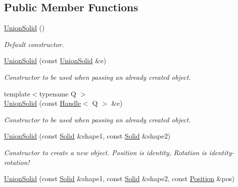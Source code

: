 \subsection*{Public Member Functions}
\begin{DoxyCompactItemize}
\item 
\hyperlink{class_d_d4hep_1_1_geometry_1_1_union_solid_abf1979091a6225ca36608b19d00e48b0}{UnionSolid} ()
\begin{DoxyCompactList}\small\item\em Default constructor. \item\end{DoxyCompactList}\item 
\hyperlink{class_d_d4hep_1_1_geometry_1_1_union_solid_a53a4143df5a2039f5ec1e5289f03fe6a}{UnionSolid} (const \hyperlink{class_d_d4hep_1_1_geometry_1_1_union_solid}{UnionSolid} \&e)
\begin{DoxyCompactList}\small\item\em Constructor to be used when passing an already created object. \item\end{DoxyCompactList}\item 
{\footnotesize template$<$typename Q $>$ }\\\hyperlink{class_d_d4hep_1_1_geometry_1_1_union_solid_ae6ccacc6c2f88a5d799775e259b0dac3}{UnionSolid} (const \hyperlink{class_d_d4hep_1_1_handle}{Handle}$<$ Q $>$ \&e)
\begin{DoxyCompactList}\small\item\em Constructor to be used when passing an already created object. \item\end{DoxyCompactList}\item 
\hyperlink{class_d_d4hep_1_1_geometry_1_1_union_solid_ac7992ce96fd9cb28f65d7c85ee114be7}{UnionSolid} (const \hyperlink{class_d_d4hep_1_1_geometry_1_1_solid__type}{Solid} \&shape1, const \hyperlink{class_d_d4hep_1_1_geometry_1_1_solid__type}{Solid} \&shape2)
\begin{DoxyCompactList}\small\item\em Constructor to create a new object. Position is identity, Rotation is identity-\/rotation! \item\end{DoxyCompactList}\item 
\hyperlink{class_d_d4hep_1_1_geometry_1_1_union_solid_a0decd4e3d915dc725a2e85163fc0b604}{UnionSolid} (const \hyperlink{class_d_d4hep_1_1_geometry_1_1_solid__type}{Solid} \&shape1, const \hyperlink{class_d_d4hep_1_1_geometry_1_1_solid__type}{Solid} \&shape2, const \hyperlink{namespace_d_d4hep_1_1_geometry_a55083902099d03506c6db01b80404900}{Position} \&pos)

\end{DoxyCompactItemize}
